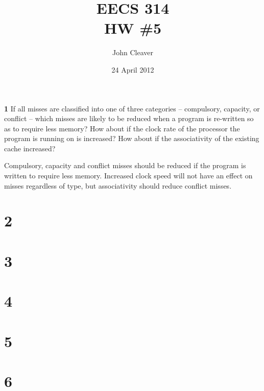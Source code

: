 \documentclass{article}
\title{EECS 314 \\ HW \#5}
\author{John Cleaver}
\date{24 April 2012}
\begin{document}
\maketitle

{\bf 1} If all misses are classified into one of  three categories – compulsory, capacity, or conflict -- which misses are likely to be reduced when a program is re-written so as to require less memory? How about if the clock rate of the processor the program is running on is increased? How about if the associativity of the existing cache increased?

Compulsory, capacity and conflict misses should be reduced if the program is written to require less memory. Increased clock speed will not have an effect on misses regardless of type, but associativity should reduce conflict misses.

\section*{2}

\section*{3}

\section*{4}

\section*{5}

\section*{6}
\end{document}
